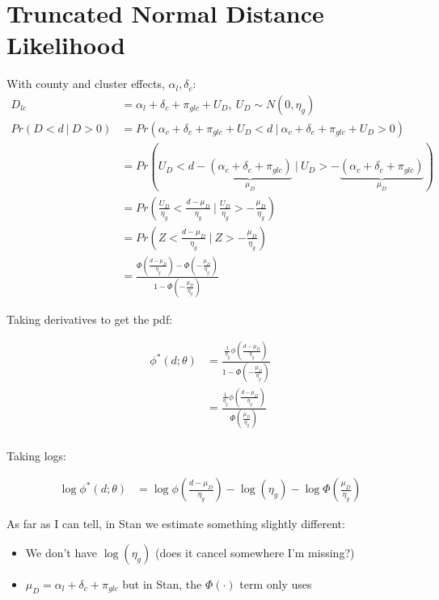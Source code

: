 \documentclass{article}
\begin{document}
    

\section*{Truncated Normal Distance Likelihood}

With county and cluster effects, $\alpha_l, \delta_c$:
\begin{align*}
  D_{lc} &= \alpha_l + \delta_c + \pi_{glc} + U_D, \ U_D \sim N(0, \eta_g) \\
  Pr(D < d \ |\  D > 0 ) &= Pr(\alpha_c + \delta_c + \pi_{glc} + U_D < d \ | \ 
  \alpha_c + \delta_c + \pi_{glc} + U_D > 0) \\
   &= Pr( U_D < d -  \underbrace{(\alpha_c + \delta_c + \pi_{glc})}_{\mu_D}\   |\  
    U_D > - \underbrace{(\alpha_c + \delta_c + \pi_{glc})}_{\mu_D}) \\ 
   &= Pr\left( \frac{U_D}{\eta_g} <  \frac{d - \mu_D}{\eta_g} \   |\  
    \frac{U_D}{\eta_g} > - \frac{\mu_D}{\eta_g}\right) \\  
    &= Pr(Z < \frac{d - \mu_D}{\eta_g} \ |\  Z > -\frac{\mu_D}{\eta_g} ) \\
    &= \frac{
      \Phi\left( \frac{d - \mu_D}{\eta_g}\right) - \Phi\left(
        -\frac{\mu_D}{\eta_g}
      \right)
    }{1 - \Phi\left(-\frac{\mu_D}{\eta_g}\right)}
\end{align*}

Taking derivatives to get the pdf:

\begin{align*}
  \phi^*(d; \theta) &= \frac{
    \frac{1}{\eta_g}\phi\left(\frac{d - \mu_D}{\eta_g}\right)
  }{1 - \Phi\left(-\frac{\mu_D}{\eta_g}\right)} \\ 
   &= \frac{
    \frac{1}{\eta_g}\phi\left(\frac{d - \mu_D}{\eta_g}\right)
  }{\Phi\left(\frac{\mu_D}{\eta_g}\right)} \\ 
\end{align*}


Taking logs:

\begin{align*}
  \log \phi^*(d;\theta) &= \log \phi\left(\frac{d - \mu_D}{\eta_g}\right) - 
  \log(\eta_g) - \log \Phi\left(\frac{\mu_D}{\eta_g}\right)
\end{align*}

As far as I can tell, in Stan we estimate something slightly different:

\begin{itemize}
  \item We don't have $\log(\eta_g)$ (does it cancel somewhere I'm missing?)
  \item $\mu_D = \alpha_l + \delta_c + \pi_{glc}$ but in Stan, the $\Phi(\cdot)$ 
   term only uses 
\end{itemize}
\end{document}
